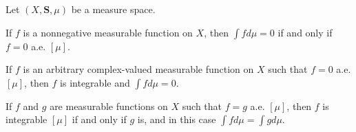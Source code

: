 Let $(X, \mathbf{S}, \mu)$ be a measure space.

If $f$ is a nonnegative measurable function on $X$, then $\int f d\mu = 0$ if and only if $f = 0$ a.e. $[\mu]$.

If $f$ is an arbitrary complex-valued measurable function on $X$ such that $f = 0$ a.e. $[\mu]$, then $f$ is integrable and $\int f d\mu = 0$.

If $f$ and $g$ are measurable functions on $X$ such that $f = g$ a.e. $[\mu]$, then $f$ is integrable $[\mu]$ if and only if $g$ is, and in this case $\int f d\mu = \int g d\mu$.
